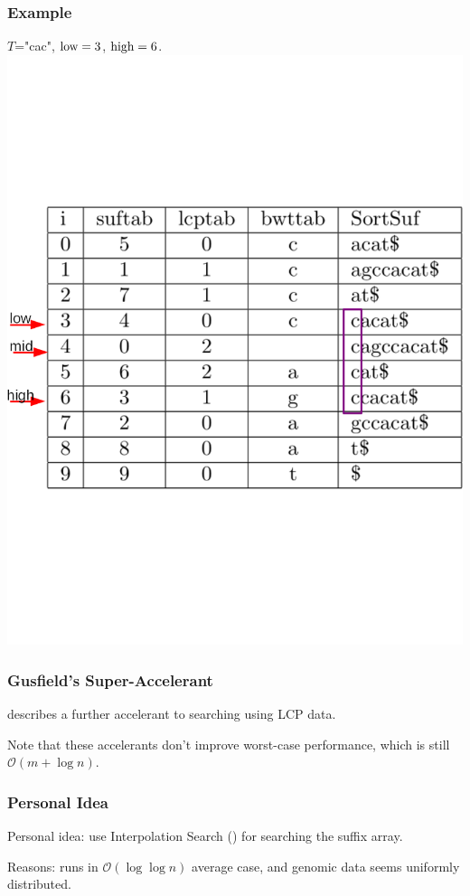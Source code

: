 \documentclass[compress,handout]{beamer} %
\renewcommand{\O}{\mathcal{O}}
\begin{document}
\begin{frame}
	\frametitle{Example}
	$T$="cac", $\hbox{low}=3$, $\hbox{high}=6$.
	\includegraphics[width=\textwidth, height=\textheight, keepaspectratio=true]{esa_LCP_search_1}
\end{frame}

\begin{frame}
	\frametitle{Gusfield's Super-Accelerant}
	\cite[pp. 152]{gusfield1997algorithms} describes a further
	accelerant to searching using LCP data.

	Note that these accelerants don't improve worst-case performance,
	which is still $\O(m + \log n)$.
\end{frame}

\begin{frame}
	\frametitle{Personal Idea}
	Personal idea: use Interpolation Search
	(\cite{perl1978interpolation}) for searching the suffix array.

	Reasons: runs in $\O(\log \log n)$ average case, and genomic
	data seems uniformly distributed.
\end{frame}
\end{document}
